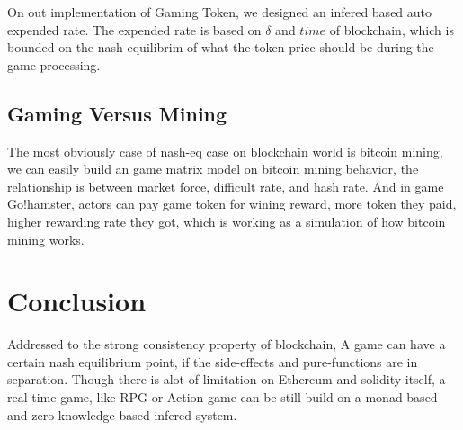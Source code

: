 \documentclass[twocolumn]{article}
\begin{document}
On out implementation of Gaming Token, we designed an infered based auto expended rate. The expended rate is based on $\delta$ and $time$ of blockchain, which is bounded on the nash equilibrim of what the token price should be during the game processing.

\subsection {Gaming Versus Mining}

The most obviously case of nash-eq case on blockchain world is bitcoin mining\cite{bitcoin}, we can easily build an game matrix model on bitcoin mining behavior, the relationship is between market force, difficult rate, and hash rate. And in game Go!hamster, actors can pay game token for wining reward, more token they paid, higher rewarding rate they got, which is working as a simulation of how bitcoin mining works.

\section {Conclusion}

Addressed to the strong consistency property of blockchain, A game can have a certain nash equilibrium point, if the side-effects and pure-functions are in separation. Though there is alot of limitation on Ethereum and solidity itself, a real-time game, like RPG or Action game can be still build on a monad based and zero-knowledge based infered system.



\end{document}
